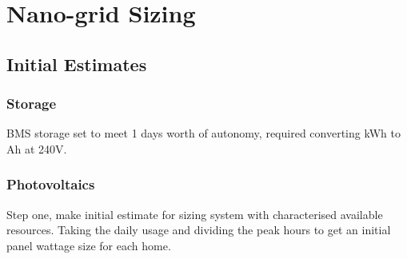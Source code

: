 \documentclass[journal]{IEEEtran}
\begin{document}
\section{Nano-grid Sizing}
        \subsection{Initial Estimates}
                \subsubsection*{Storage}
                BMS storage set to meet 1 days worth of autonomy, required converting kWh to Ah at 240V.

                \subsubsection*{Photovoltaics}
                Step one, make initial estimate for sizing system with characterised available resources. Taking the daily usage and dividing the peak hours to get an initial panel wattage size for each home. 
                
\end{document}
